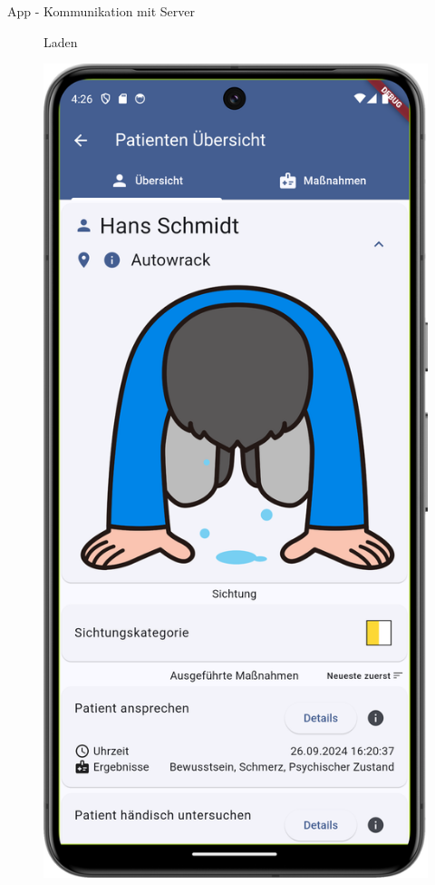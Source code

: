 \begin{frame}{App - Kommunikation mit Server}
\begin{figure}
\begin{minipage}{0.3\textwidth}
            \par{Laden}
        \end{minipage}
        \hspace{0.5cm}
        \begin{minipage}{0.3\textwidth}
            \centering
            \includegraphics[height=0.8\textheight]{images/app/screenshots/concurrency_ok.png}

\end{minipage}
\end{figure}
\end{frame}
